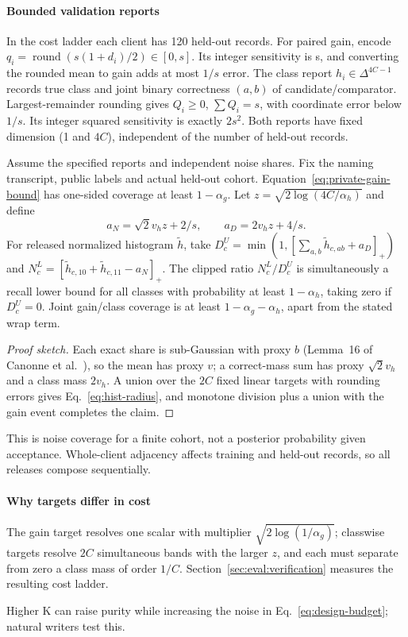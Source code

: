 \paragraph{Bounded validation reports}
In the cost ladder each client has 120 held-out records. For paired gain, encode
$q_i=\operatorname{round}(s(1+d_i)/2)\in[0,s]$. Its integer sensitivity
is s, and converting the rounded mean to gain adds at most $1/s$ error.
The class report $h_i\in\Delta^{4C-1}$ records true class and joint binary
correctness $(a,b)$ of candidate/comparator. Largest-remainder rounding
gives $Q_i\ge0$, $\sum Q_i=s$, with coordinate error below $1/s$.
Its integer squared sensitivity is exactly $2s^2$. Both reports have fixed
dimension (1 and $4C$), independent of the number of held-out records.

\begin{valueprop}
\label{prop:private-validation}
Assume the specified reports and independent noise shares. Fix the naming
transcript, public labels and actual held-out cohort.
Equation~\eqref{eq:private-gain-bound} has one-sided coverage at least
$1-\alpha_g$. Let $z=\sqrt{2\log(4C/\alpha_h)}$ and define
\begin{equation}
a_N=\sqrt2v_h z+2/s,\qquad a_D=2v_h z+4/s.
\label{eq:hist-radius}
\end{equation}
For released normalized histogram $\tilde h$, take
$D_c^U=\min(1,[\sum_{a,b}\tilde h_{c,ab}+a_D]_+)$ and
$N_c^L=[\tilde h_{c,10}+\tilde h_{c,11}-a_N]_+$.
The clipped ratio $N_c^L/D_c^U$ is simultaneously a recall lower bound for
all classes with probability at least $1-\alpha_h$, taking zero if $D_c^U=0$.
Joint gain/class coverage is at least $1-\alpha_g-\alpha_h$, apart from
the stated wrap term.
\end{valueprop}
\begin{proof}[Proof sketch]
Each exact share is sub-Gaussian with proxy $b$ (Lemma~16 of
Canonne et al.~\cite{canonne2020discrete}), so the mean has proxy $v$; a
correct-mass sum has proxy $\sqrt2v_h$ and a class mass $2v_h$. A union over
the $2C$ fixed linear targets with rounding errors gives
Eq.~\eqref{eq:hist-radius}, and monotone division plus a union with the gain
event completes the claim.
\end{proof}

This is noise coverage for a finite cohort, not a posterior probability
given acceptance. Whole-client adjacency affects training and held-out
records, so all releases compose sequentially.

\paragraph{Why targets differ in cost}
The gain target resolves one scalar with multiplier
$\sqrt{2\log(1/\alpha_g)}$; classwise targets resolve $2C$ simultaneous
bands with the larger $z$, and each must separate from zero a class mass of
order $1/C$. Section~\ref{sec:eval:verification} measures the resulting
cost ladder.

Higher K can raise purity while increasing the noise in
Eq.~\eqref{eq:design-budget}; natural writers test this.
